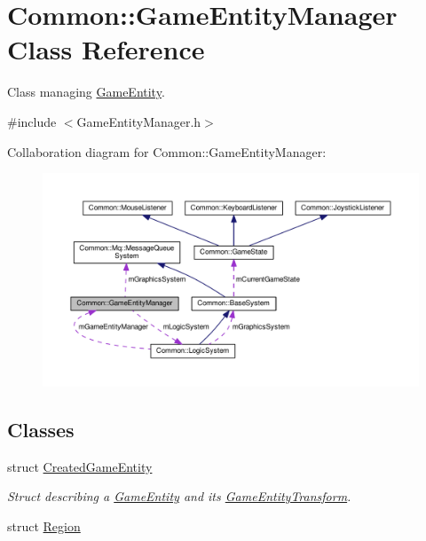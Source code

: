 \hypertarget{class_common_1_1_game_entity_manager}{}\section{Common\+:\+:Game\+Entity\+Manager Class Reference}
\label{class_common_1_1_game_entity_manager}


Class managing \hyperlink{struct_common_1_1_game_entity}{Game\+Entity}.  




{\ttfamily \#include $<$Game\+Entity\+Manager.\+h$>$}



Collaboration diagram for Common\+:\+:Game\+Entity\+Manager\+:\nopagebreak
\begin{figure}[H]
\begin{center}
\leavevmode
\includegraphics[width=350pt]{class_common_1_1_game_entity_manager__coll__graph}
\end{center}
\end{figure}
\subsection*{Classes}
\begin{DoxyCompactItemize}
\item 
struct \hyperlink{struct_common_1_1_game_entity_manager_1_1_created_game_entity}{Created\+Game\+Entity}
\begin{DoxyCompactList}\small\item\em Struct describing a \hyperlink{struct_common_1_1_game_entity}{Game\+Entity} and its \hyperlink{struct_common_1_1_game_entity_transform}{Game\+Entity\+Transform}. \end{DoxyCompactList}\item 
struct \hyperlink{struct_common_1_1_game_entity_manager_1_1_region}{Region}
\end{DoxyCompactItemize}

